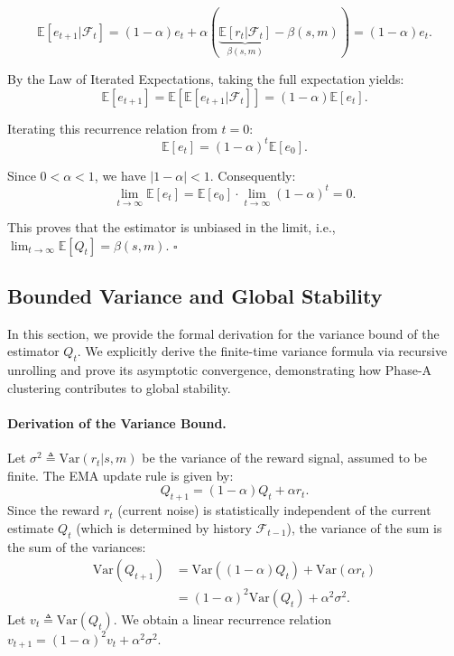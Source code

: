 \documentclass{article}
\theoremstyle{plain}
\theoremstyle{definition}
\theoremstyle{remark}
\begin{document}
\begin{equation*}
    \mathbb{E}[e_{t+1} | \mathcal{F}_t] = (1-\alpha)e_t + \alpha (\underbrace{\mathbb{E}[r_t | \mathcal{F}_t]}_{\beta(s,m)} - \beta(s,m)) = (1-\alpha)e_t.
\end{equation*}

By the Law of Iterated Expectations, taking the full expectation yields:
\begin{equation*}
    \mathbb{E}[e_{t+1}] = \mathbb{E}[\mathbb{E}[e_{t+1} | \mathcal{F}_t]] = (1-\alpha)\mathbb{E}[e_t].
\end{equation*}

Iterating this recurrence relation from $t=0$:
\begin{equation*}
    \mathbb{E}[e_t] = (1-\alpha)^t \mathbb{E}[e_0].
\end{equation*}

Since $0 < \alpha < 1$, we have $|1-\alpha| < 1$. Consequently:
\begin{equation}
    \lim_{t \to \infty} \mathbb{E}[e_t] = \mathbb{E}[e_0] \cdot \lim_{t \to \infty} (1-\alpha)^t = 0.
\end{equation}

This proves that the estimator is unbiased in the limit, i.e., $\lim_{t \to \infty} \mathbb{E}[Q_t] = \beta(s,m)$. \hfill $\square$


\subsection{Bounded Variance and Global Stability}
\label{app:bounded_variance}

In this section, we provide the formal derivation for the variance bound of the estimator $Q_t$. We explicitly derive the finite-time variance formula via recursive unrolling and prove its asymptotic convergence, demonstrating how Phase-A clustering contributes to global stability.

\paragraph{Derivation of the Variance Bound.}
Let $\sigma^2 \triangleq \mathrm{Var}(r_t | s, m)$ be the variance of the reward signal, assumed to be finite. The EMA update rule is given by:
\begin{equation*}
    Q_{t+1} = (1-\alpha)Q_t + \alpha r_t.
\end{equation*}
Since the reward $r_t$ (current noise) is statistically independent of the current estimate $Q_t$ (which is determined by history $\mathcal{F}_{t-1}$), the variance of the sum is the sum of the variances:
\begin{align*}
    \mathrm{Var}(Q_{t+1}) 
    &= \mathrm{Var}((1-\alpha)Q_t) + \mathrm{Var}(\alpha r_t) \\
    &= (1-\alpha)^2 \mathrm{Var}(Q_t) + \alpha^2 \sigma^2.
\end{align*}
Let $v_t \triangleq \mathrm{Var}(Q_t)$. We obtain a linear recurrence relation $v_{t+1} = (1-\alpha)^2 v_t + \alpha^2 \sigma^2$.
\end{document}

